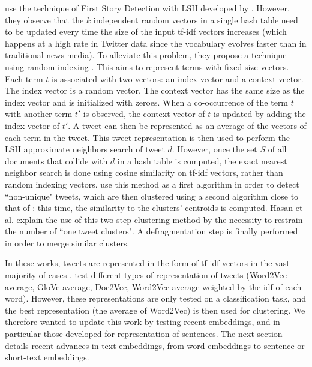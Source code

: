 \citet{hasan_twitternews_2016} use the technique of First Story Detection with LSH developed by \citet{petrovic_streaming_2010}. However, they observe that the $k$ independent random vectors in a single hash table need to be updated every time the size of the input tf-idf vectors increases (which happens at a high rate in Twitter data since the vocabulary evolves faster than in traditional news media). To alleviate this problem, they propose a technique using random indexing \citep{sahlgren_introduction_2005}. This  aims to represent terms with fixed-size vectors. Each term $t$ is associated with two vectors: an index vector and a context vector. The index vector is a random vector. The context vector has the same size as the index vector and is initialized with zeroes. When a co-occurrence of the term $t$ with another term $t'$ is observed, the context vector of $t$ is updated by adding the index vector of $t'$. A tweet can then be represented as an average of the vectors of each term in the tweet. This tweet representation is then used to perform the LSH approximate neighbors search of tweet $d$. However, once the set $S$ of all documents that collide with $d$ in a hash table is computed, the exact nearest neighbor search is done using cosine similarity on tf-idf vectors, rather than random indexing vectors. \citet{hasan_twitternews_2016} use this method as a first algorithm in order to detect ``non-unique" tweets, which are then clustered using a second algorithm close to that of \citet{sankaranarayanan_twitterstand:_2009}: this time, the similarity to the clusters' centroids is computed. Hasan et al. explain the use of this two-step clustering method by the necessity to restrain the number of ``one tweet clusters". A defragmentation step is finally performed in order to merge similar clusters.


In these works, tweets are represented in the form of tf-idf vectors in the vast majority of cases \citep{sankaranarayanan_twitterstand:_2009, petrovic_streaming_2010, becker_automatic_2011, hasan_twitternews_2016}. \citet{repp_extracting_2018} test different types of representation of tweets (Word2Vec average, GloVe average, Doc2Vec, Word2Vec average weighted by the idf of each word). However, these representations are only tested on a classification task, and the best representation (the average of Word2Vec) is then used for clustering. We therefore wanted to update this work by testing recent embeddings, and in particular those developed for representation of sentences. The next section details recent advances in text embeddings, from word embeddings to sentence or short-text embeddings.

